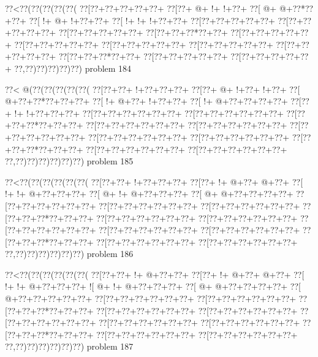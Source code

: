 \vbox{\vbox{\goo
\0??<\0??(\0??(\0??(\0??(\0??(
\0??[\0??+\0??+\0??+\0??+\0??+
\0??[\0??+\- @+\- !+\- !+\0??+
\0??[\- @+\- @+\0??*\0??+\0??+
\0??[\- !+\- @+\- !+\0??+\0??+
\0??[\- !+\- !+\- !+\0??+\0??+
\0??[\0??+\0??+\0??+\0??+\0??+
\0??[\0??+\0??+\0??+\0??+\0??+
\0??[\0??+\0??+\0??+\0??+\0??+
\0??[\0??+\0??+\0??*\0??+\0??+
\0??[\0??+\0??+\0??+\0??+\0??+
\0??[\0??+\0??+\0??+\0??+\0??+
\0??[\0??+\0??+\0??+\0??+\0??+
\0??[\0??+\0??+\0??+\0??+\0??+
\0??[\0??+\0??+\0??+\0??+\0??+
\0??[\0??+\0??+\0??*\0??+\0??+
\0??[\0??+\0??+\0??+\0??+\0??+
\0??[\0??+\0??+\0??+\0??+\0??+
\0??,\0??)\0??)\0??)\0??)\0??)
}
\hfil problem 184\hfil\break
}

\vbox{\vbox{\goo
\0??<\- @(\0??(\0??(\0??(\0??(\0??(
\0??[\0??+\0??+\- !+\0??+\0??+\0??+
\0??[\0??+\- @+\- !+\0??+\- !+\0??+
\0??[\- @+\0??+\0??*\0??+\0??+\0??+
\0??[\- !+\- @+\0??+\- !+\0??+\0??+
\0??[\- !+\- @+\0??+\0??+\0??+\0??+
\0??[\0??+\- !+\- !+\0??+\0??+\0??+
\0??[\0??+\0??+\0??+\0??+\0??+\0??+
\0??[\0??+\0??+\0??+\0??+\0??+\0??+
\0??[\0??+\0??+\0??*\0??+\0??+\0??+
\0??[\0??+\0??+\0??+\0??+\0??+\0??+
\0??[\0??+\0??+\0??+\0??+\0??+\0??+
\0??[\0??+\0??+\0??+\0??+\0??+\0??+
\0??[\0??+\0??+\0??+\0??+\0??+\0??+
\0??[\0??+\0??+\0??+\0??+\0??+\0??+
\0??[\0??+\0??+\0??*\0??+\0??+\0??+
\0??[\0??+\0??+\0??+\0??+\0??+\0??+
\0??[\0??+\0??+\0??+\0??+\0??+\0??+
\0??,\0??)\0??)\0??)\0??)\0??)\0??)
}
\hfil problem 185\hfil\break
}

\vbox{\vbox{\goo
\0??<\0??(\0??(\0??(\0??(\0??(\0??(
\0??[\0??+\0??+\- !+\0??+\0??+\0??+
\0??[\0??+\- !+\- @+\0??+\- @+\0??+
\0??[\- !+\- !+\- @+\0??+\0??+\0??+
\0??[\- @+\- !+\- @+\0??+\0??+\0??+
\0??[\- @+\- @+\0??+\0??+\0??+\0??+
\0??[\0??+\0??+\0??+\0??+\0??+\0??+
\0??[\0??+\0??+\0??+\0??+\0??+\0??+
\0??[\0??+\0??+\0??+\0??+\0??+\0??+
\0??[\0??+\0??+\0??*\0??+\0??+\0??+
\0??[\0??+\0??+\0??+\0??+\0??+\0??+
\0??[\0??+\0??+\0??+\0??+\0??+\0??+
\0??[\0??+\0??+\0??+\0??+\0??+\0??+
\0??[\0??+\0??+\0??+\0??+\0??+\0??+
\0??[\0??+\0??+\0??+\0??+\0??+\0??+
\0??[\0??+\0??+\0??*\0??+\0??+\0??+
\0??[\0??+\0??+\0??+\0??+\0??+\0??+
\0??[\0??+\0??+\0??+\0??+\0??+\0??+
\0??,\0??)\0??)\0??)\0??)\0??)\0??)
}
\hfil problem 186\hfil\break
}

\vbox{\vbox{\goo
\0??<\0??(\0??(\0??(\0??(\0??(\0??(
\0??[\0??+\0??+\- !+\- @+\0??+\0??+
\0??[\0??+\- !+\- @+\0??+\- @+\0??+
\0??[\- !+\- !+\- @+\0??+\0??+\0??+
\- ![\- @+\- !+\- @+\0??+\0??+\0??+
\0??[\- @+\- @+\0??+\0??+\0??+\0??+
\0??[\- @+\0??+\0??+\0??+\0??+\0??+
\0??[\0??+\0??+\0??+\0??+\0??+\0??+
\0??[\0??+\0??+\0??+\0??+\0??+\0??+
\0??[\0??+\0??+\0??*\0??+\0??+\0??+
\0??[\0??+\0??+\0??+\0??+\0??+\0??+
\0??[\0??+\0??+\0??+\0??+\0??+\0??+
\0??[\0??+\0??+\0??+\0??+\0??+\0??+
\0??[\0??+\0??+\0??+\0??+\0??+\0??+
\0??[\0??+\0??+\0??+\0??+\0??+\0??+
\0??[\0??+\0??+\0??*\0??+\0??+\0??+
\0??[\0??+\0??+\0??+\0??+\0??+\0??+
\0??[\0??+\0??+\0??+\0??+\0??+\0??+
\0??,\0??)\0??)\0??)\0??)\0??)\0??)
}
\hfil problem 187\hfil\break
}

